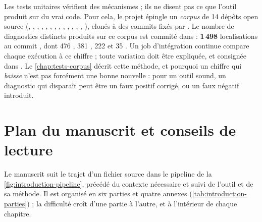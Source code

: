 \begin{sloppypar}
Les tests unitaires vérifient des mécanismes ; ils ne disent pas ce que
l'outil produit sur du vrai code. Pour cela, le projet épingle un
\emph{corpus} de 14 dépôts open source (,
, , , ,
, , ,
, , ,
, , ), clonés à des commits
fixés par . Le nombre de diagnostics
distincts produits sur ce corpus est commité dans
 : \textbf{1\,498} localisations au commit
\snapshotCommit{}, dont 476 , 381
, 222  et 35
. Un job d'intégration continue compare chaque
exécution à ce chiffre ; toute variation doit être expliquée, et consignée
dans . Le \cref{chap:tests-corpus} décrit cette
méthode, et pourquoi un chiffre qui \emph{baisse} n'est pas forcément une
bonne nouvelle : pour un outil sound, un diagnostic qui disparaît peut être un
faux positif corrigé, ou un faux négatif introduit.
\end{sloppypar}

\section{Plan du manuscrit et conseils de lecture}
\label{sec:introduction-plan}

Le manuscrit suit le trajet d'un fichier source dans le pipeline de la
\cref{fig:introduction-pipeline}, précédé du contexte nécessaire et suivi de
l'outil et de sa méthode. Il est organisé en six parties et quatre annexes
(\cref{tab:introduction-parties}) ; la difficulté croît d'une partie à
l'autre, et à l'intérieur de chaque chapitre.

